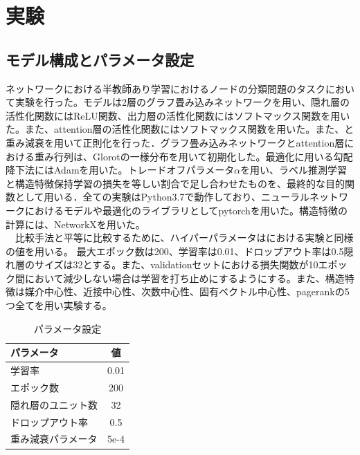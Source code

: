 \chapter{実験}

\section{モデル構成とパラメータ設定}
ネットワークにおける半教師あり学習におけるノードの分類問題のタスクにおいて実験を行った。モデルは2層のグラフ畳み込みネットワークを用い、隠れ層の活性化関数にはReLU関数、出力層の活性化関数にはソフトマックス関数を用いた。また、attention層の活性化関数にはソフトマックス関数を用いた。また、\cite{dropout}と重み減衰を用いて正則化を行った．グラフ畳み込みネットワークとattention層における重み行列は、Glorotの一様分布\cite{glorot}を用いて初期化した。最適化に用いる勾配降下法にはAdam\cite{Adam}を用いた。トレードオフパラメータ$\alpha$を用い、ラベル推測学習と構造特徴保持学習の損失を等しい割合で足し合わせたものを、最終的な目的関数として用いる．全ての実験はPython3.7で動作しており、ニューラルネットワークにおけるモデルや最適化のライブラリとしてpytorchを用いた。構造特徴の計算には、NetworkXを用いた。\\
　比較手法と平等に比較するために、ハイパーパラメータは\cite{gcn}における実験と同様の値を用いる。
 最大エポック数は200、学習率は0.01、ドロップアウト率は0.5隠れ層のサイズは32とする。また、validationセットにおける損失関数が10エポック間において減少しない場合は学習を打ち止めにするようにする。また、構造特徴は媒介中心性、近接中心性、次数中心性、固有ベクトル中心性、pagerankの5つ全てを用い実験する。
\begin{table}[h]
\begin{center}
\label{parameter}
\caption{パラメータ設定}
  \begin{tabular}{l|c} \hline
  パラメータ & 値 \\ \hline
  学習率 & 0.01 \\
  エポック数 & 200 \\
  隠れ層のユニット数 & 32 \\
  ドロップアウト率 & 0.5 \\
  重み減衰パラメータ & 5e-4\\ \hline
  \end{tabular}
  \end{center}
\end{table}

